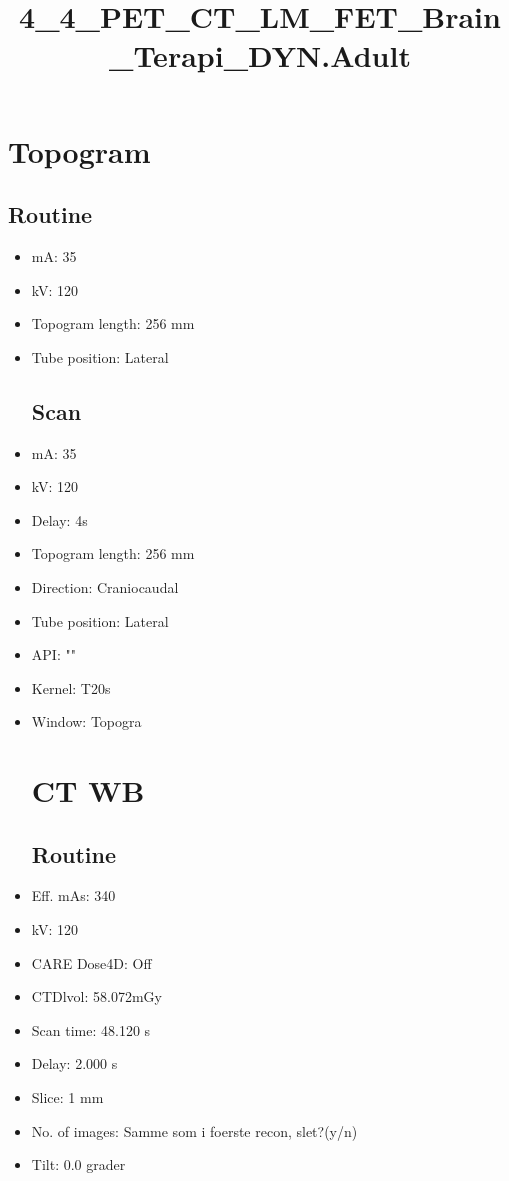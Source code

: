 \documentclass[12pt]{article}
\title{4\_4\_PET\_CT\_LM\_FET\_Brain\_Terapi\_DYN.Adult}
\begin{document}
\maketitle
\newpage
\tableofcontents
\newpage
{}


\section{Topogram}
\subsection{Routine}
 \begin{itemize}\item mA: 35\item kV: 120\item Topogram length: 256 mm\item Tube position: Lateral
\subsection{Scan}
\item mA: 35\item kV: 120\item Delay: 4s\item Topogram length: 256 mm\item Direction: Craniocaudal\item Tube position: Lateral\item API: ""\item Kernel: T20s\item Window: Topogra
\section{CT WB}
\subsection{Routine}
\item Eff. mAs: 340\item kV: 120\item CARE Dose4D: Off\item CTDlvol: 58.072mGy\item Scan time: 48.120 s\item Delay: 2.000 s\item Slice: 1 mm\item No. of images: Samme som i foerste recon, slet?(y/n)\item Tilt: 0.0 grader

\end{itemize}
\end{document}
